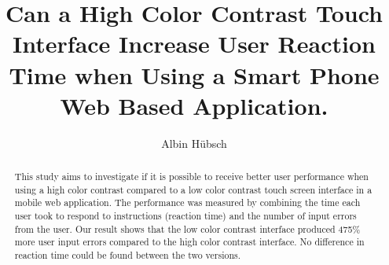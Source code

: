 \documentclass[runningheads,a4paper]{llncs}
\begin{document}
\pagestyle{headings}

\mainmatter


\title{Can a High Color Contrast Touch Interface Increase User Reaction Time when Using a Smart Phone Web Based Application.}





\author{Albin Hübsch}


\maketitle

%
\begin{abstract}
This study aims to investigate if it is possible to receive better user performance when using a high color contrast compared to a low color contrast touch screen interface in a mobile web application. The performance was measured by combining the time each user took to respond to instructions (reaction time) and the number of input errors from the user. Our result shows that the low color contrast interface produced 475\% more user input errors compared to the high color contrast interface. No difference in reaction time could be found between the two versions. 
\end{abstract}
%
%
\end{document}
